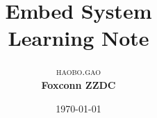 \documentclass [a4paper,12pt,oneside] {report}
\begin{document}
\title{\textbf{Embed System }\\ %
 Learning Note} %

\author{\textsc{haobo.gao} %
\\{\textbf{Foxconn ZZDC}}} %

\date{\today} %
\maketitle






\end{document}
